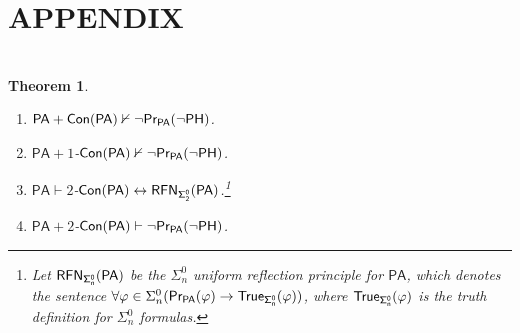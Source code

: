 \documentclass[a4paper,12pt]{amsart}
\newtheorem{theorem}{Theorem}[section]
\theoremstyle{definition}
\numberwithin{equation}{section}
\begin{document}
\section*{{\bf APPENDIX}}
\section*{}\label{proof details} 
\begin{theorem}\label{indep of PH}
\begin{enumerate}[(1)]
  \item $\mathsf{PA}+\sf Con(\mathsf{PA})\nvdash \neg \sf Pr_{\mathsf{PA}}(\neg \sf PH)$.
  \item  $\mathsf{PA}+1$-$\sf Con(\mathsf{PA})\nvdash \neg \sf Pr_{\mathsf{PA}}(\neg \sf PH)$.
  \item $\mathsf{PA}\vdash 2$-$\sf Con(\mathsf{PA})\leftrightarrow \sf RFN_{\Sigma^0_2}(\mathsf{PA})$.\footnote{Let $\sf RFN_{\Sigma^0_n}(\mathsf{PA})$ be the  $\Sigma^0_n$ uniform reflection principle for $\mathsf{PA}$, which denotes the sentence $\forall \varphi\in \Sigma^0_n (\sf Pr_{\mathsf{PA}}(\varphi)\rightarrow \sf True_{\Sigma^0_n}(\varphi))$, where $\sf True_{\Sigma^0_n}(\varphi)$ is the truth definition for $\Sigma^0_n$ formulas.}
  \item   $\mathsf{PA}+2$-$\sf Con(\mathsf{PA})\vdash \neg \sf Pr_{\mathsf{PA}}(\neg \sf PH)$.
\end{enumerate}
\end{theorem}
\end{document}
